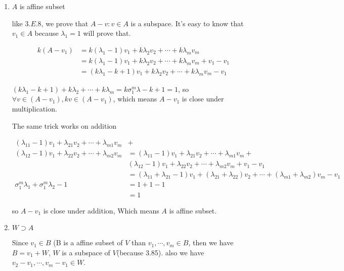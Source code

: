 \begin{enumerate}[label=(\alph*)]
\item $A$ is affine subset

like $3.E.8$, we prove that $A-v: v\in A$ is a subspace. It's easy to know that $v_{1} \in A$ because $\lambda_{1} = 1$ will prove that.

\begin{equation*}
    \begin{split}
    k (A-v_{1}) &= k(\lambda_{1} - 1)v_{1} + k\lambda_{2}v_{2} + \cdots + k\lambda_{m}v_{m} \\
    &= k(\lambda_{1} - 1)v_{1} + k\lambda_{2}v_{2} + \cdots + k\lambda_{m}v_{m} + v_{1} - v_{1} \\
    &= (k\lambda_{1} - k + 1)v_{1} + k\lambda_{2}v_{2} + \cdots + k\lambda_{m}v_{m}  - v_{1}
    \end{split}
\end{equation*}

$(k\lambda_{1} - k + 1) + k\lambda_{2} + \cdots + k\lambda_{m} = k\sigma_{1}^{m}\lambda - k + 1 = 1$, 
so $\forall v \in (A-v_{1}), kv \in (A-v_{1})$, which means $A-v_{1}$ is close under multiplication.

The same trick works on addition

\begin{equation*}
    \begin{split}
    (\lambda_{11} - 1)v_{1} + \lambda_{21}v_{2} + \cdots + \lambda_{m1}v_{m} &+ \\
    (\lambda_{12} - 1)v_{1} + \lambda_{22}v_{2} + \cdots + \lambda_{m2}v_{m} &= (\lambda_{11} - 1)v_{1} + \lambda_{21}v_{2} + \cdots + \lambda_{m1}v_{m} +\\
    & (\lambda_{12} - 1)v_{1} + \lambda_{22}v_{2} + \cdots + \lambda_{m2}v_{m} + v_{1} - v_{1} \\
    &= (\lambda_{11} + \lambda_{21} - 1)v_{1} + (\lambda_{21}+\lambda_{22})v_{2} + \cdots + (\lambda_{m1}+\lambda_{m2})v_{m} - v_{1} \\
    \sigma_{1}^{m}\lambda_{1} + \sigma_{1}^{m}\lambda_{2} - 1 &= 1 + 1 - 1 \\
    &= 1
    \end{split}
\end{equation*}

so $A-v_{1}$ is close under addition, Which means $A$ is affine subset.

\item $W\supset A$

Since $v_{1}\in B$ (B is a affine subset of $V$ than $v_{1},\cdots,v_{m} \in B$, then we have $B = v_{1} + W$, $W$ is a subspace of $V$(because 3.85). also we have $v_{2}-v_{1}, \cdots, v_{m}-v_{1} \in W$.


\end{enumerate}
